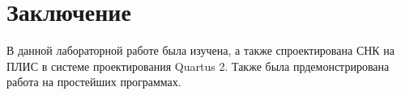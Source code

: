 \chapter*{Заключение}

В данной лабораторной работе была изучена, а также спроектирована СНК на ПЛИС в системе проектирования Quartus 2. Также была прдемонстрирована работа на простейших программах.
